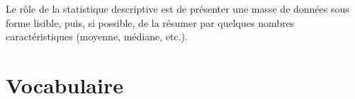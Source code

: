 %
%






Le rôle de la statistique descriptive est de présenter une masse de
données sous forme lisible, puis, si possible, de la résumer par
quelques nombres caractéristiques (moyenne, médiane, etc.).




\section{Vocabulaire}


